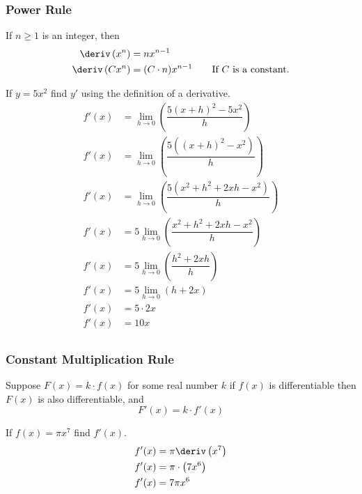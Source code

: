 \subsubsection{Power Rule}
\begin{theorem}
    If $n \geq 1$ is an integer, then
    \begin{align}
       \deriv \left(x^n\right) &= nx^{n-1} \\
       \deriv \left(Cx^n\right) &= (C \cdot n)x^{n-1} \qquad \text{If $C$ is a constant.}
    \end{align}
\end{theorem}
\begin{review}
    If $y = 5x^2$ find $y'$ using the definition of a derivative.
    \begin{align*}
        f'(x) &= \lim_{h \to 0} \left(\dfrac{5\left(x + h\right)^2 - 5x^2}{h}\right) \\
        f'(x) &= \lim_{h \to 0} \left(\dfrac{5\left(\left(x + h\right)^2 - x^2\right)}{h}\right) \\
        f'(x) &= \lim_{h \to 0} \left(\dfrac{5\left(x^2 + h^2 + 2xh - x^2\right)}{h}\right) \\
        f'(x) &= 5\lim_{h \to 0} \left(\dfrac{x^2 + h^2 + 2xh - x^2}{h}\right) \\
        f'(x) &= 5\lim_{h \to 0} \left(\dfrac{h^2 + 2xh}{h}\right) \\
        f'(x) &= 5\lim_{h \to 0} \left(h + 2x\right) \\
        f'(x) &= 5 \cdot 2x \\
        f'(x) &= 10x \\
    \end{align*}
\end{review}
\subsubsection{Constant Multiplication Rule}
\begin{theorem}
    Suppose $F(x) = k \cdot f(x)$ for some real number $k$ if $f(x)$ is differentiable then $F(x)$ is also differentiable, and
    \begin{equation}
        F'(x) = k \cdot f'(x)
    \end{equation}
\end{theorem}
\begin{example}
    If $f(x) = \pi x^7$ find $f'(x)$.
    \begin{align*}
        f'(x) &= \pi \deriv \left(x^7\right) \\
        f'(x) &= \pi \cdot \left(7x^6\right) \\
        f'(x) &= 7\pi x^6
    \end{align*}
\end{example}
